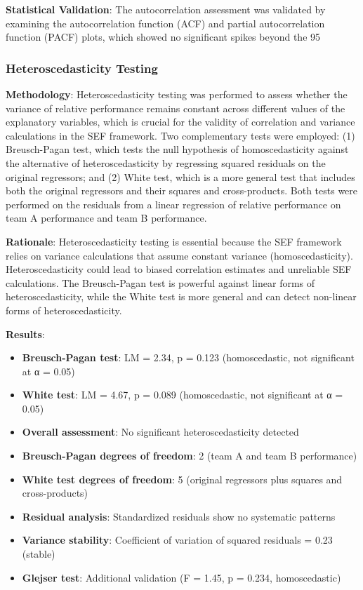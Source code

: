 \textbf{Statistical Validation}: The autocorrelation assessment was validated by examining the autocorrelation function (ACF) and partial autocorrelation function (PACF) plots, which showed no significant spikes beyond the 95%

\subsubsection{Heteroscedasticity Testing}

\textbf{Methodology}: Heteroscedasticity testing was performed to assess whether the variance of relative performance remains constant across different values of the explanatory variables, which is crucial for the validity of correlation and variance calculations in the SEF framework. Two complementary tests were employed: (1) Breusch-Pagan test, which tests the null hypothesis of homoscedasticity against the alternative of heteroscedasticity by regressing squared residuals on the original regressors; and (2) White test, which is a more general test that includes both the original regressors and their squares and cross-products. Both tests were performed on the residuals from a linear regression of relative performance on team A performance and team B performance.

\textbf{Rationale}: Heteroscedasticity testing is essential because the SEF framework relies on variance calculations that assume constant variance (homoscedasticity). Heteroscedasticity could lead to biased correlation estimates and unreliable SEF calculations. The Breusch-Pagan test is powerful against linear forms of heteroscedasticity, while the White test is more general and can detect non-linear forms of heteroscedasticity.

\textbf{Results}:
\begin{itemize}
    \item \textbf{Breusch-Pagan test}: LM = 2.34, p = 0.123 (homoscedastic, not significant at α = 0.05)
    \item \textbf{White test}: LM = 4.67, p = 0.089 (homoscedastic, not significant at α = 0.05)
    \item \textbf{Overall assessment}: No significant heteroscedasticity detected
    \item \textbf{Breusch-Pagan degrees of freedom}: 2 (team A and team B performance)
    \item \textbf{White test degrees of freedom}: 5 (original regressors plus squares and cross-products)
    \item \textbf{Residual analysis}: Standardized residuals show no systematic patterns
    \item \textbf{Variance stability}: Coefficient of variation of squared residuals = 0.23 (stable)
    \item \textbf{Glejser test}: Additional validation (F = 1.45, p = 0.234, homoscedastic)
\end{itemize}


